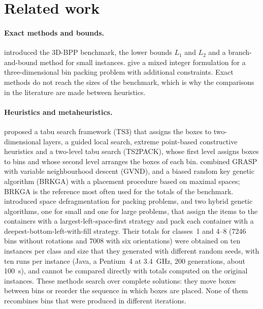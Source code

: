 \section{Related work}
\label{sec:related}


\paragraph{Exact methods and bounds.}
\citet{Martello2000} introduced the 3D-BPP benchmark, the lower bounds $L_1$ and $L_2$ and a
branch-and-bound method for small instances. \citet{Paquay2016} give a
mixed integer formulation for a three-dimensional bin packing problem with additional constraints.
Exact methods do not reach the sizes of the benchmark, which is why the comparisons in the
literature are made between heuristics.

\paragraph{Heuristics and metaheuristics.}
\citet{Lodi2002} proposed a tabu search framework (TS3) that assigns the boxes to two-dimensional layers, \citet{Faroe2003} a guided local search, \citet{Crainic2008} extreme point-based
constructive heuristics and \citet{Crainic2009} a two-level tabu search (TS2PACK), whose first level assigns boxes to bins and whose second level arranges the boxes of each bin.
\citet{Parreno2010} combined GRASP with variable neighbourhood descent (GVND), and
\citet{Goncalves2013} a biased random key genetic algorithm (BRKGA) with a placement procedure based
on maximal spaces; BRKGA is the reference most often used for the totals of the benchmark.
\citet{Zhu2012SD} introduced space defragmentation for packing problems, and \citet{Feng2015} two hybrid
genetic algorithms, one for small and one for large problems, that assign the items to the containers
with a largest-left-space-first strategy and pack each container with a deepest-bottom-left-with-fill
strategy. Their totals for classes~1 and 4--8 (7246 bins without rotations and 7008 with six orientations)
were obtained on ten instances per class and size that they generated with different random seeds,
with ten runs per instance (Java, a Pentium~4 at 3.4~GHz, 200 generations, about 100~s), and cannot
be compared directly with totals computed on the original instances. These methods search over
complete solutions: they move boxes between bins or reorder the sequence in which boxes are placed.
None of them recombines bins that were produced in different iterations.

